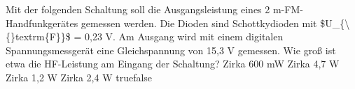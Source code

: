     {Mit der folgenden Schaltung soll die Ausgangsleistung eines 2 m-FM-Handfunkgerätes gemessen werden. Die Dioden sind Schottkydioden mit \$U\_\{\textbackslash\{\}textrm\{F\}\}\$ = 0,23 V. Am Ausgang wird mit einem digitalen Spannungsmessgerät eine Gleichspannung von 15,3 V gemessen. Wie groß ist etwa die HF-Leistung am Eingang der Schaltung?}
    {Zirka 600 mW}
    {Zirka 4,7 W}
    {Zirka 1,2 W}
    {Zirka 2,4 W}
    {true}{false}
